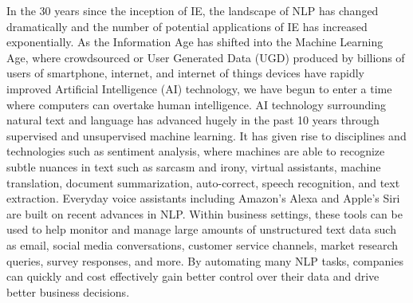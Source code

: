 In the 30 years since the inception of IE, the landscape of NLP has changed dramatically and the number of potential 
applications of IE has increased exponentially. As the Information Age has shifted into the Machine Learning Age, where 
crowdsourced or User Generated Data (UGD) produced by billions of users of smartphone, internet, and internet of things 
devices have rapidly improved Artificial Intelligence (AI) technology, we have begun to enter a time where computers can 
overtake human intelligence. AI technology surrounding natural text and language has advanced hugely in the past 10 years 
through supervised and unsupervised machine learning. It has given rise to disciplines and technologies such as sentiment 
analysis, where machines are able to recognize subtle nuances in text such as sarcasm and irony, virtual assistants, machine 
translation, document summarization, auto-correct, speech recognition, and text extraction. Everyday voice assistants including 
Amazon’s Alexa and Apple’s Siri are built on recent advances in NLP.  Within business settings, these tools can be used to help 
monitor and manage large amounts of unstructured text data such as email, social media conversations, customer service channels, 
market research queries, survey responses, and more. By automating many NLP tasks, companies can quickly and cost effectively 
gain better control over their data and drive better business decisions. 

